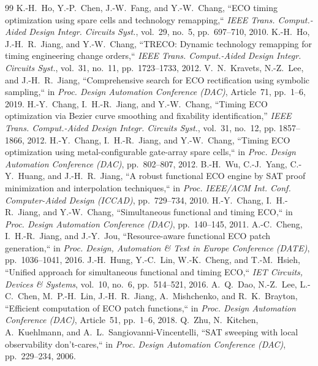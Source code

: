 \documentclass[journal]{IEEEtran}
\begin{document}
\begin{thebibliography}{99}
 K.-H.~Ho, Y.-P.~Chen, J.-W.~Fang, and Y.-W.~Chang, ``ECO timing optimization using spare cells and technology remapping,`` \emph{IEEE Trans. Comput.-Aided Design Integr. Circuits Syst.}, vol.~29, no.~5, pp.~697--710, 2010.
 K.-H.~Ho, J.-H.~R.~Jiang, and Y.-W.~Chang, ``TRECO: Dynamic technology remapping for timing engineering change orders,`` \emph{IEEE Trans. Comput.-Aided Design Integr. Circuits Syst.}, vol.~31, no.~11, pp.~1723--1733, 2012.
 V.~N.~Kravets, N.-Z.~Lee, and J.-H.~R.~Jiang, ``Comprehensive search for ECO rectification using symbolic sampling,`` in \emph{Proc. Design Automation Conference (DAC)}, Article~71, pp.~1--6, 2019.
 H.-Y.~Chang, I.~H.-R.~Jiang, and Y.-W.~Chang, ``Timing ECO optimization via Bezier curve smoothing and fixability identification,'' \emph{IEEE Trans. Comput.-Aided Design Integr. Circuits Syst.}, vol.~31, no.~12, pp. 1857--1866, 2012.
 H.-Y.~Chang, I.~H.-R.~Jiang, and Y.-W.~Chang, ``Timing ECO optimization using metal-configurable gate-array spare cells,`` in \emph{Proc. Design Automation Conference (DAC)}, pp.~802--807, 2012.
 B.-H.~Wu, C.-J.~Yang, C.-Y.~Huang, and J.-H.~R.~Jiang, ``A robust functional ECO engine by SAT proof minimization and interpolation techniques,`` in \emph{Proc. IEEE/ACM Int. Conf. Computer-Aided Design (ICCAD)}, pp.~729--734, 2010.
 H.-Y.~Chang, I.~H.-R.~Jiang, and Y.-W.~Chang, ``Simultaneous functional and timing ECO,`` in \emph{Proc. Design Automation Conference (DAC)}, pp.~140--145, 2011.
 A.-C.~Cheng, I.~H.-R.~Jiang, and J.-Y.~Jou, ``Resource-aware functional ECO patch generation,`` in \emph{Proc. Design, Automation \& Test in Europe Conference (DATE)}, pp.~1036--1041, 2016.
 J.-H.~Hung, Y.-C.~Lin, W.-K.~Cheng, and T.-M.~Hsieh, ``Unified approach for simultaneous functional and timing ECO,`` \emph{IET Circuits, Devices \& Systems}, vol.~10, no.~6, pp.~514--521, 2016.
 A.~Q.~Dao, N.-Z.~Lee, L.-C.~Chen, M.~P.-H.~Lin, J.-H.~R.~Jiang, A.~Mishchenko, and R.~K.~Brayton, ``Efficient computation of ECO patch functions,`` in \emph{Proc. Design Automation Conference (DAC)}, Article~51, pp.~1--6, 2018.
 Q.~Zhu, N.~Kitchen, A.~Kuehlmann, and A.~L.~Sangiovanni-Vincentelli, ``SAT sweeping with local observability don't-cares,`` in \emph{Proc. Design Automation Conference (DAC)}, pp.~229--234, 2006.

\end{thebibliography}
\end{document}
